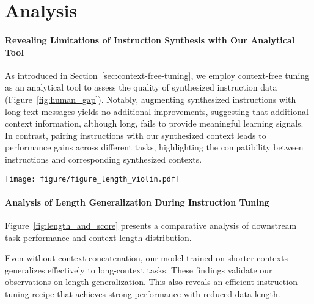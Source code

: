 \section{Analysis}
\label{sec:analysis}

\paragraph{Revealing Limitations of Instruction Synthesis with Our Analytical Tool}
As introduced in Section~\ref{sec:context-free-tuning}, we employ context-free tuning as an analytical tool to assess the quality of synthesized instruction data (Figure~\ref{fig:human_gap}).
Notably, augmenting synthesized instructions with long text messages yields no additional improvements, suggesting that additional context information, although long, fails to provide meaningful learning signals.
In contrast, pairing instructions with our synthesized context leads to performance gains across different tasks, highlighting the compatibility between instructions and corresponding synthesized contexts.

\begin{figure*}[ht]
    \centering
    \texttt{[image: figure/figure\_length\_violin.pdf]}
    \caption{In the left panel, we present a task-wise performance comparison of different synthesis strategies. In the right panel, we display the context length distribution of different synthesis strategies against test sets across different tasks.}
    \label{fig:length_and_score}
\end{figure*}

\noindent\paragraph{Analysis of Length Generalization During Instruction Tuning}
Figure~\ref{fig:length_and_score} presents a comparative analysis of downstream task performance and context length distribution.
\begingroup
\renewcommand{\arraystretch}{1.3} %
\begin{table}[ht]
\footnotesize
\centering
{}
\caption{Average performance of using different LLMs as context synthesis engines across three groups of downstream tasks. All experiments are conducted with \texttt{LLaMA3.1-8B}.}
\label{tab:coherent}
\end{table}
\endgroup
Even without context concatenation, our model trained on shorter contexts generalizes effectively to long-context tasks.
These findings validate our observations on length generalization.
This also reveals an efficient instruction-tuning recipe that achieves strong performance with reduced data length.

